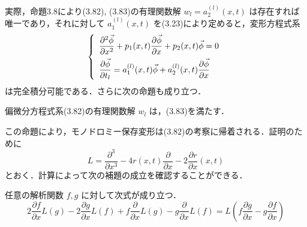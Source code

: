 \begin{story}
実際，命題3.8により(3.82), (3.83)の有理関数解 $w_l = a_2^{(l)}(x,t)$ は存在すれば唯一であり，それに対して $a_1^{(l)}(x,t)$ を(3.23)により定めると，変形方程式系
\begin{equation}
\left\{
\begin{array}{l}
    \displaystyle \frac{\partial^2 \vec{\phi}}{\partial x^2} + p_1(x,t)\frac{\partial \vec{\phi}}{\partial x} + p_2(x,t)\vec{\phi} = 0 \vspace{0.5em} \\
    \displaystyle \frac{\partial \vec{\phi}}{\partial t_l} = a_1^{(l)}(x,t)\vec{\phi} + a_2^{(l)}(x,t)\frac{\partial \vec{\phi}}{\partial x}
\end{array}
\right. \label{eq:3.20}
\end{equation}
は完全積分可能である．さらに次の命題も成り立つ．

\begin{proposition}[3.14]
偏微分方程式系(3.82)の有理関数解 $w_l$ は，(3.83)を満たす．
\end{proposition}

この命題により，モノドロミー保存変形は(3.82)の考察に帰着される．証明のために
\begin{equation*}
    L = \frac{\partial^3}{\partial x^3} - 4r(x,t)\frac{\partial}{\partial x} - 2\frac{\partial r}{\partial x}(x,t)
\end{equation*}
とおく．計算によって次の補題の成立を確認することができる．

\begin{lemma}[3.6]
任意の解析関数 $f,g$ に対して次式が成り立つ．
\begin{equation*}
    2\frac{\partial f}{\partial x}L(g) - 2\frac{\partial g}{\partial x}L(f) + f\frac{\partial}{\partial x}L(g) - g\frac{\partial}{\partial x}L(f) = L\left( f\frac{\partial g}{\partial x} - g\frac{\partial f}{\partial x} \right)
\end{equation*}
\end{lemma}

\end{story}

